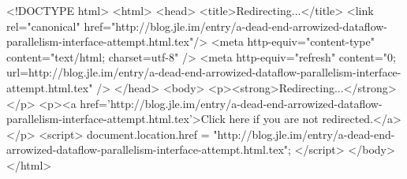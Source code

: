 <!DOCTYPE html>
<html>
<head>
<title>Redirecting...</title>
<link rel="canonical" href="http://blog.jle.im/entry/a-dead-end-arrowized-dataflow-parallelism-interface-attempt.html.tex"/>
<meta http-equiv="content-type" content="text/html; charset=utf-8" />
<meta http-equiv="refresh" content="0; url=http://blog.jle.im/entry/a-dead-end-arrowized-dataflow-parallelism-interface-attempt.html.tex" />
</head>
<body>
  <p><strong>Redirecting...</strong></p>
  <p><a href='http://blog.jle.im/entry/a-dead-end-arrowized-dataflow-parallelism-interface-attempt.html.tex'>Click here if you are not redirected.</a></p>
  <script>
    document.location.href = "http://blog.jle.im/entry/a-dead-end-arrowized-dataflow-parallelism-interface-attempt.html.tex";
  </script>
</body>
</html>
